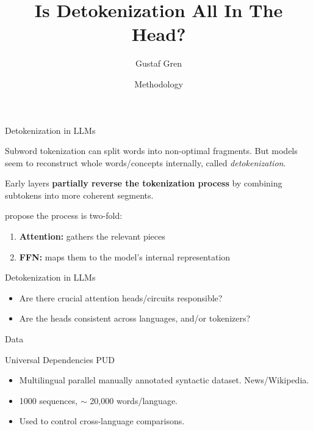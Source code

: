 \documentclass{beamer}
\title{Is Detokenization All In The Head?}
\author{Gustaf Gren}
\date{Methodology}
\begin{document}
\begin{frame}
  \titlepage
\end{frame}

\begin{frame}{Detokenization in LLMs}

Subword tokenization can split words into non-optimal fragments. But models seem to reconstruct whole words/concepts internally, called \textit{detokenization}\parencite{elhage2022a}.

\bigskip

Early layers \textbf{partially reverse the tokenization process} by combining subtokens into more coherent segments\parencite{lad2024,ferrando2024}.

\bigskip

\textcite{kaplan2025} propose the process is two-fold:
\begin{enumerate}
\item \textbf{Attention:} gathers the relevant pieces\parencite{ferrando2024, lad2024, elhage2022a}
\item \textbf{FFN:} maps them to the model's internal representation\parencite{geva2022}
\end{enumerate}

\end{frame}

\begin{frame}{Detokenization in LLMs}
\begin{itemize}
\item Are there crucial attention heads/circuits responsible?
\item Are the heads consistent across languages, and/or tokenizers?
\end{itemize}
\end{frame}

\begin{frame}{Data}

\begin{block}{Universal Dependencies PUD \parencite{nivre2020, akhundjanova2025}}
\begin{itemize}
\item Multilingual parallel manually annotated syntactic dataset. News/Wikipedia.
\item 1000 sequences, $\sim$ 20,000 words/language.
\item Used to control cross-language comparisons.
\end{itemize}
\end{block}

\end{frame}
\end{document}
